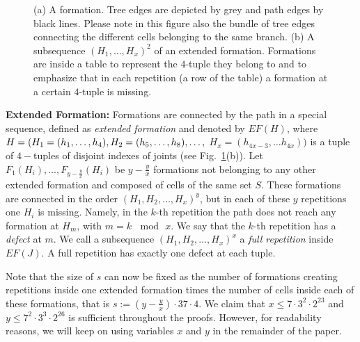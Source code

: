 \documentclass[a4paper,10pt]{llncs}
\begin{document}
\begin{figure}[tb]
\caption{(a) A formation. Tree edges are depicted by grey and path edges by black lines. Please note in this figure also the bundle of tree edges connecting the different cells belonging to the same branch. (b) A subsequence $(H_1,\dots,H_x)^2$ of an extended formation. Formations are inside a table to represent the $4$-tuple they belong to and to emphasize that in each repetition (a row of the table) a formation at a certain $4$-tuple is missing.}\label{fig:formation}
\end{figure}

{\bf Extended Formation:}
Formations are connected by the path in a special sequence, defined as {\it extended formation} and denoted by $EF(H)$, where $H=(H_1=(h_1,\ldots, h_4), \\H_2=(h_5,\ldots , h_8), \ldots, $ $H_x= (h_{4x-3}, \ldots h_{4x}))$ is a tuple of $4-$tuples of disjoint indexes of joints (see Fig.~\ref{fig:formation}(b)). Let $F_1(H_i),\ldots ,F_{y-\frac{y}{x}}(H_i)$ be $y-\frac{y}{x}$ formations  not belonging to any other extended formation and composed of cells of the same set $S$. These formations are connected in the order $(H_1,H_2,\ldots ,H_x)^y$, but in each of these $y$ repetitions one $H_i$ is missing. Namely, in the $k$-th repetition the path does not reach any formation at $H_m$, with $m = k \,\mod\, x$. We say that the $k$-th repetition has a {\it defect} at $m$. We call a subsequence $(H_1,H_2,\ldots,H_x)^x$ a \emph{full repetition} inside $EF(J)$. A full repetition has exactly one defect at each tuple.

Note that the size of $s$ can now be fixed as the number of formations creating repetitions inside one extended formation times the number of cells inside each of these formations, that is $s:=(y-\frac{y}{x})\cdot 37 \cdot 4$. We claim that $x \leq 7\cdot 3^2\cdot 2^{23}$ and $y \leq 7^2\cdot 3^3 \cdot 2^{26}$ is sufficient throughout the proofs. However, for readability reasons, we will keep on using variables $x$ and $y$ in the remainder of the paper.
\end{document}
